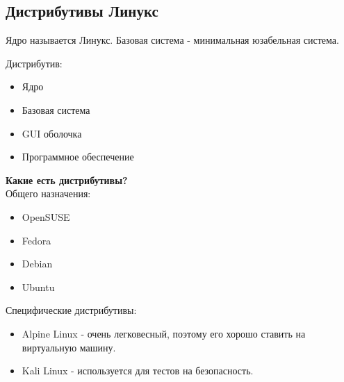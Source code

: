 \subsection{Дистрибутивы Линукс}

Ядро называется Линукс. Базовая система - минимальная юзабельная система.

Дистрибутив:
\begin{itemize}
	\item Ядро
	\item Базовая система
	\item GUI оболочка
	\item Программное обеспечение 
\end{itemize}

\textbf{Какие есть дистрибутивы?} \\
Общего назначения:
\begin{itemize}
	\item OpenSUSE
	\item Fedora
	\item Debian
	\item Ubuntu
\end{itemize}

Специфические дистрибутивы:
\begin{itemize}
	\item Alpine Linux - очень легковесный, поэтому его
	хорошо ставить на виртуальную машину.
	\item Kali Linux - используется для тестов на безопасность.
\end{itemize}


